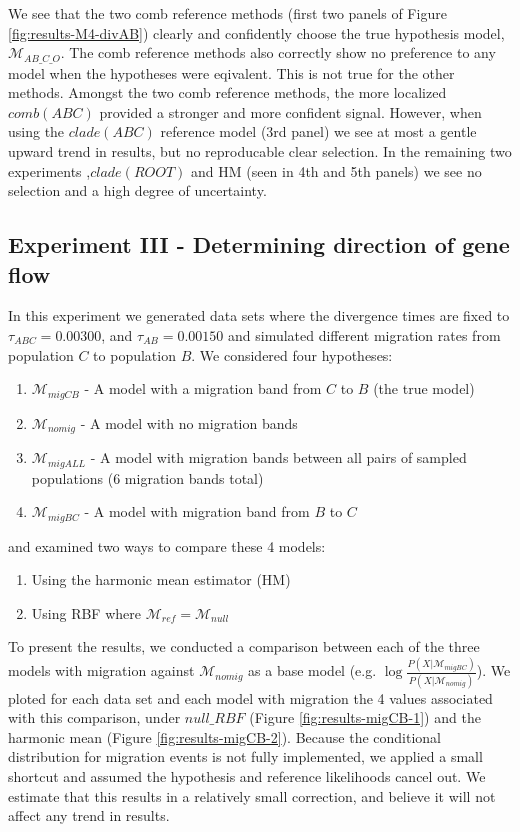 \documentclass[11pt]{article}
\newcommand{\M}{\mathcal{M}}
\newcommand{\Mref}{\M_{ref}}
\newcommand{\1}{\mathbbm{1}}
\begin{document}
We see that the two comb reference methods (first two panels of Figure \ref{fig:results-M4-divAB}) clearly and confidently choose the true hypothesis model, $\M_{AB\_C\_O}$.
%
The comb reference methods also correctly show no preference to any model when the hypotheses were eqivalent. This is not true for the other methods.
%
Amongst the two comb reference methods, the more localized $comb(ABC)$ provided a stronger and more confident signal.
%
However, when using the $clade(ABC)$ reference model (3rd panel) we see at most a gentle upward trend in results, but no reproducable clear selection. 
%
In the remaining two experiments ,$clade(ROOT)$ and HM (seen in 4th and 5th panels) we see no selection and a high degree of uncertainty.



\subsection{Experiment III - Determining direction of gene flow}
In this experiment we generated data sets where the divergence times are fixed to $\tau_{ABC} = 0.00300$, and $\tau_{AB} = 0.00150$ and simulated different migration rates from population $C$ to population $B$.
%
We considered four hypotheses:
\begin{enumerate}

\item $\M_{migCB}$ - A model with a migration band from $C$ to $B$ (the true model)

\item $\M_{nomig}$ - A model with no migration bands

\item $\M_{migALL}$ - A model with migration bands between all pairs of sampled populations (6 migration bands total)

\item $\M_{migBC}$ - A model with migration band from $B$ to $C$

\end{enumerate}
%
and examined two ways to compare these 4 models:
\begin{enumerate}
\item Using the harmonic mean estimator (HM)
\item Using RBF where $\Mref = \M_{null}$

\end{enumerate}

To present the results, we conducted a comparison between each of the three models with migration against $\M_{nomig}$ as a base model (e.g. $\log{ \frac{P(X|\M_{migBC})}{P(X|\M_{nomig})}}$). 
%
We ploted for each data set and each model with migration the 4 values associated with this comparison, under $null\_RBF$ (Figure \ref{fig:results-migCB-1}) and the harmonic mean (Figure \ref{fig:results-migCB-2}). 
%
Because the conditional distribution for migration events is not fully implemented, we applied a small shortcut and assumed the hypothesis and reference likelihoods cancel out. We estimate that this results in a relatively small correction, and believe it will not affect any trend in results.
\end{document}
